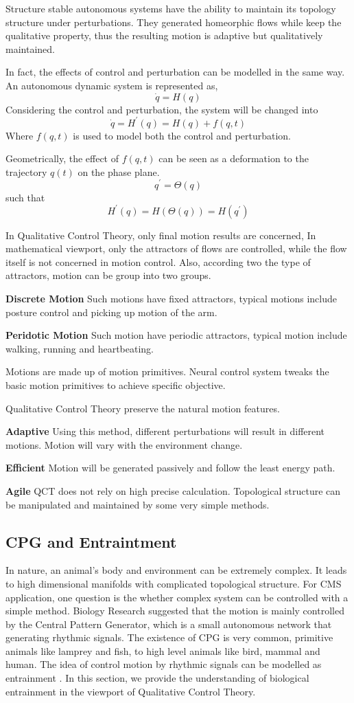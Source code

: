 Structure stable autonomous systems have the ability to maintain its topology structure under perturbations.
They generated homeorphic flows while keep the qualitative property, thus the resulting motion is adaptive but qualitatively maintained.

In fact, the effects of control and perturbation can be modelled in the same way.
An autonomous dynamic system is represented as,  
\[
\dot{q}=H(q)
\]
Considering the control and perturbation, the system will be changed into
\[
\dot{q}=H^{'}(q)=H(q)+f(q,t)
\]
Where $f(q,t)$ is used to model both the control and perturbation.

Geometrically, the effect of $f(q,t)$ can be seen as a deformation to the trajectory $q(t)$ on the phase plane.
\[
q^{'}=\Theta(q)
\]
such that 
\[
H^{'}(q)=H(\Theta(q))=H(q^{'})
\]


In Qualitative Control Theory, only final motion results are concerned, 
In mathematical viewport, only the attractors of flows are controlled, while the flow itself is not concerned in motion control.
Also, according two the type of attractors, motion can be group into two groups.

\textbf{Discrete Motion}
Such motions have fixed attractors, typical motions include posture control and picking up motion of the arm.

\textbf{Peridotic Motion}
Such motion have periodic attractors, typical motion include walking, running and heartbeating.

Motions are made up of motion primitives.
Neural control system tweaks the basic motion primitives to achieve specific objective.


Qualitative Control Theory preserve the natural motion features.

\textbf{Adaptive}
Using this method, 
different perturbations will result in different motions. 
Motion will vary with the environment change.

\textbf{Efficient}
Motion will be generated passively and follow the least energy path.

\textbf{Agile}
QCT does not rely on high precise calculation.
Topological structure can be manipulated and maintained by some very simple methods.


\subsection{CPG and Entraintment}
In nature, an animal's body and environment can be extremely complex. 
It leads to high dimensional manifolds with complicated topological structure. 
For CMS application, one question is the whether complex system can be controlled with a simple method.
Biology Research suggested that the motion is mainly controlled by the Central Pattern Generator, which is a small autonomous network that generating rhythmic signals.
The existence of CPG is very common, primitive animals like lamprey and fish, to high level animals like bird, mammal and human\citep{Cohen1988}.
The idea of control motion by rhythmic signals can be modelled as entrainment \citep{Gonz'alez-Miranda2004}.
In this section, we provide the understanding of biological entrainment in the viewport of  Qualitative Control Theory.



